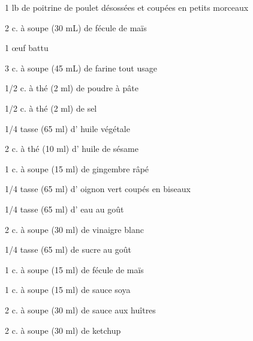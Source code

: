 %
%   
%   
%   
%




\totaltime{}


\begin{ingredients}
    \item 1 lb de poitrine de poulet désossées et coupées en petits morceaux
    \item 2 c. à soupe (30 mL) de fécule de maïs
    \item 1 œuf battu
    \item 3 c. à soupe (45 mL) de farine tout usage
    \item 1/2 c. à thé (2 ml) de poudre à pâte
    \item 1/2 c. à thé (2 ml) de sel
    \item 1/4 tasse (65 ml) d' huile végétale
    \item 2 c. à thé (10 ml) d' huile de sésame
    \item 1 c. à soupe (15 ml) de gingembre râpé
    \item 1/4 tasse (65 ml) d' oignon vert coupés en biseaux
    \item 1/4 tasse (65 ml) d' eau au goût
    \item 2 c. à soupe (30 ml) de vinaigre blanc
    \item 1/4 tasse (65 ml) de sucre au goût
    \item 1 c. à soupe (15 ml) de fécule de maïs
    \item 1 c. à soupe (15 ml) de sauce soya
    \item 2 c. à soupe (30 ml) de sauce aux huîtres
    \item 2 c. à soupe (30 ml) de ketchup
\end{ingredients}

